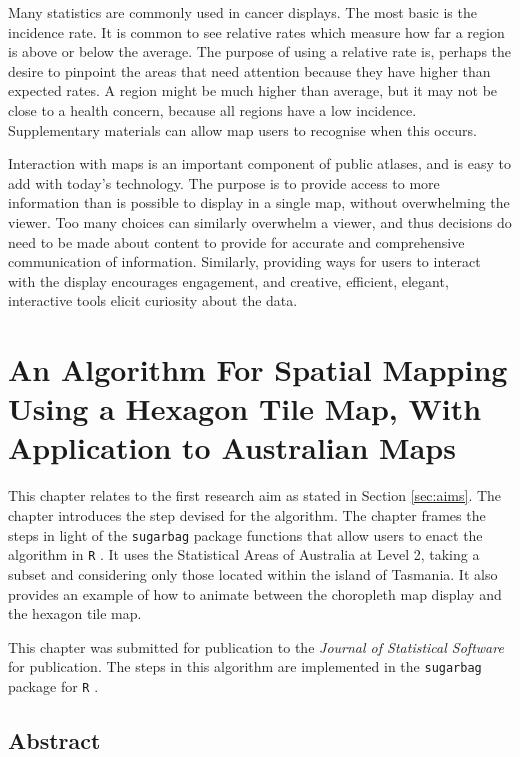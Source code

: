 \documentclass{monashthesis}
\begin{document}
Many statistics are commonly used in cancer displays. The most basic is the incidence rate. It is common to see relative rates which measure how far a region is above or below the average. The purpose of using a relative rate is, perhaps the desire to pinpoint the areas that need attention because they have higher than expected rates.
A region might be much higher than average, but it may not be close to a health concern, because all regions have a low incidence. Supplementary materials can allow map users to recognise when this occurs.

Interaction with maps is an important component of public atlases, and is easy to add with today's technology. The purpose is to provide access to more information than is possible to display in a single map, without overwhelming the viewer. Too many choices can similarly overwhelm a viewer, and thus decisions do need to be made about content to provide for accurate and comprehensive communication of information. Similarly, providing ways for users to interact with the display encourages engagement, and creative, efficient, elegant, interactive tools elicit curiosity about the data.

\hypertarget{ch:algorithm}{%
\chapter{An Algorithm For Spatial Mapping Using a Hexagon Tile Map, With Application to Australian Maps}\label{ch:algorithm}}

This chapter relates to the first research aim as stated in Section \ref{sec:aims}.
The chapter introduces the step devised for the algorithm.
The chapter frames the steps in light of the \texttt{sugarbag} \autocite{sugarbag} package functions that allow users to enact the algorithm in \texttt{R} \autocite{R}. It uses the Statistical Areas of Australia at Level 2, taking a subset and considering only those located within the island of Tasmania.
It also provides an example of how to animate between the choropleth map display and the hexagon tile map.

This chapter was submitted for publication to the \emph{Journal of Statistical Software} for publication.
The steps in this algorithm are implemented in the \texttt{sugarbag} \autocite{sugarbag} package for \texttt{R} \autocite{R}.



\hypertarget{abstract-2}{%
\section*{Abstract}\label{abstract-2}}
\end{document}
